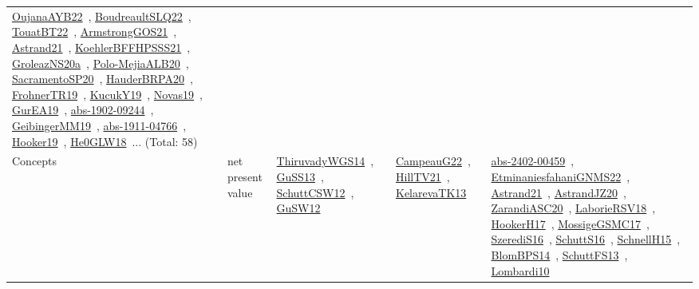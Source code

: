{\begin{longtable}{lp{3cm}>{\raggedright\arraybackslash}p{6cm}>{\raggedright\arraybackslash}p{6cm}>{\raggedright\arraybackslash}p{8cm}}
\href{../works/OujanaAYB22.pdf}{OujanaAYB22}~\cite{OujanaAYB22}, \href{../works/BoudreaultSLQ22.pdf}{BoudreaultSLQ22}~\cite{BoudreaultSLQ22}, \href{../works/TouatBT22.pdf}{TouatBT22}~\cite{TouatBT22}, \href{../works/ArmstrongGOS21.pdf}{ArmstrongGOS21}~\cite{ArmstrongGOS21}, \href{../works/Astrand21.pdf}{Astrand21}~\cite{Astrand21}, \href{../works/KoehlerBFFHPSSS21.pdf}{KoehlerBFFHPSSS21}~\cite{KoehlerBFFHPSSS21}, \href{../works/GroleazNS20a.pdf}{GroleazNS20a}~\cite{GroleazNS20a}, \href{../works/Polo-MejiaALB20.pdf}{Polo-MejiaALB20}~\cite{Polo-MejiaALB20}, \href{../works/SacramentoSP20.pdf}{SacramentoSP20}~\cite{SacramentoSP20}, \href{../works/HauderBRPA20.pdf}{HauderBRPA20}~\cite{HauderBRPA20}, \href{../works/FrohnerTR19.pdf}{FrohnerTR19}~\cite{FrohnerTR19}, \href{../works/KucukY19.pdf}{KucukY19}~\cite{KucukY19}, \href{../works/Novas19.pdf}{Novas19}~\cite{Novas19}, \href{../works/GurEA19.pdf}{GurEA19}~\cite{GurEA19}, \href{../works/abs-1902-09244.pdf}{abs-1902-09244}~\cite{abs-1902-09244}, \href{../works/GeibingerMM19.pdf}{GeibingerMM19}~\cite{GeibingerMM19}, \href{../works/abs-1911-04766.pdf}{abs-1911-04766}~\cite{abs-1911-04766}, \href{../works/Hooker19.pdf}{Hooker19}~\cite{Hooker19}, \href{../works/He0GLW18.pdf}{He0GLW18}~\cite{He0GLW18}... (Total: 58)\\
Concepts & net present value & \href{../works/ThiruvadyWGS14.pdf}{ThiruvadyWGS14}~\cite{ThiruvadyWGS14}, \href{../works/GuSS13.pdf}{GuSS13}~\cite{GuSS13}, \href{../works/SchuttCSW12.pdf}{SchuttCSW12}~\cite{SchuttCSW12}, \href{../works/GuSW12.pdf}{GuSW12}~\cite{GuSW12} & \href{../works/CampeauG22.pdf}{CampeauG22}~\cite{CampeauG22}, \href{../works/HillTV21.pdf}{HillTV21}~\cite{HillTV21}, \href{../works/KelarevaTK13.pdf}{KelarevaTK13}~\cite{KelarevaTK13} & \href{../works/abs-2402-00459.pdf}{abs-2402-00459}~\cite{abs-2402-00459}, \href{../works/EtminaniesfahaniGNMS22.pdf}{EtminaniesfahaniGNMS22}~\cite{EtminaniesfahaniGNMS22}, \href{../works/Astrand21.pdf}{Astrand21}~\cite{Astrand21}, \href{../works/AstrandJZ20.pdf}{AstrandJZ20}~\cite{AstrandJZ20}, \href{../works/ZarandiASC20.pdf}{ZarandiASC20}~\cite{ZarandiASC20}, \href{../works/LaborieRSV18.pdf}{LaborieRSV18}~\cite{LaborieRSV18}, \href{../works/HookerH17.pdf}{HookerH17}~\cite{HookerH17}, \href{../works/MossigeGSMC17.pdf}{MossigeGSMC17}~\cite{MossigeGSMC17}, \href{../works/SzerediS16.pdf}{SzerediS16}~\cite{SzerediS16}, \href{../works/SchuttS16.pdf}{SchuttS16}~\cite{SchuttS16}, \href{../works/SchnellH15.pdf}{SchnellH15}~\cite{SchnellH15}, \href{../works/BlomBPS14.pdf}{BlomBPS14}~\cite{BlomBPS14}, \href{../works/SchuttFS13.pdf}{SchuttFS13}~\cite{SchuttFS13}, \href{../works/Lombardi10.pdf}{Lombardi10}~\cite{Lombardi10}\\

\end{longtable}}
